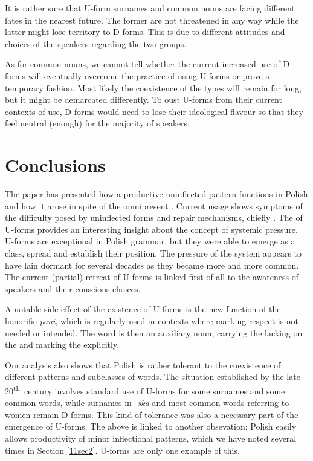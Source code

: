 \documentclass[output=paper,colorlinks,citecolor=brown]{langscibook}
\begin{document}
It is rather sure that U-form surnames and common nouns are facing different fates in the nearest future. The former are not threatened in any way while the latter might lose territory to D-forms. This is due to different attitudes and choices of the speakers regarding the two groups.

As for common nouns, we cannot tell whether the current increased use of D-forms will eventually overcome the practice of using U-forms or prove a temporary fashion. Most likely the coexistence of the types will remain for long, but it might be demarcated differently. To oust U-forms from their current contexts of use, D-forms would need to lose their ideological flavour so that they feel neutral (enough) for the majority
of speakers.

\section{Conclusions}

The paper has presented how a productive uninflected pattern functions in Polish and how it arose in spite of the omnipresent . Current usage shows symptoms of the difficulty posed by uninflected forms and repair mechanisms, chiefly . The  of U-forms provides an interesting insight about the concept of systemic pressure. U-forms are exceptional in Polish grammar, but they were able to emerge as a class, spread and establish their position. The pressure of the system appears to have lain dormant for several decades as they became more and more common. The current (partial) retreat of U-forms is linked first of all to the awareness of speakers and their conscious choices.

A notable side effect of the existence of U-forms is the new function of the  honorific \emph{pani}, which is regularly used in contexts where marking respect is not needed or intended. The word is then an auxiliary noun, carrying the  lacking on the  and marking the  explicitly.

Our analysis also shows that Polish is rather tolerant to the coexistence of different patterns and subclasses of words. The situation established by the late 20\textsuperscript{th}~century involves standard use of U-forms for some surnames and some common words, while surnames in \emph{-ska} and most common words referring to women remain D-forms. This kind of tolerance was also a necessary part of the emergence of U-forms. The above is linked to another obsevation: Polish easily allows productivity of minor inflectional patterns, which we have noted several times in Section \ref{11sec2}. U-forms are only one example of this.
\end{document}
